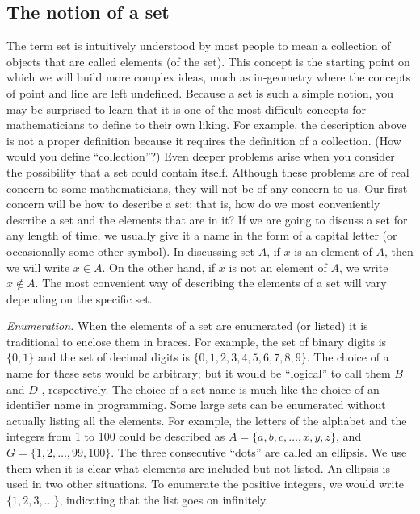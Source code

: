 \documentclass[10pt,]{book}
\theoremstyle{plain}
\theoremstyle{definition}
\begin{document}
\subsection[The notion of a set]{The notion of a set}\label{subsection-1}
The term set is intuitively understood by most people to mean a collection of objects that are called elements (of the set). This concept is the
starting point on which we will build more complex ideas, much as in-geometry where the concepts of point and line are left undefined. 
Because a set is such a simple notion, you may be surprised to learn that it is one of the most difficult concepts for mathematicians to define to
their own liking. For example, the description above is not a proper definition because it requires the definition of a collection. (How would you
define ``collection''?) Even deeper problems arise when you consider the possibility that a set could contain itself. Although these problems
are of real concern to some mathematicians, they will not be of any concern to us. 
Our first concern will be how to describe a set; that is, how do we most conveniently describe a set and the elements that are in it? If we are going to discuss a set for any length of time, we usually give it a name in the form of a capital letter (or occasionally some other symbol). In discussing set \( A\), if \( x\) is an element of \( A\), then we will write \(x \in  A\). On the other hand, if \( x\) is not an element
of \( A\), we write \(x \notin  A\). The most convenient way of describing the elements of a set will vary depending on the specific set. %
\par
\emph{ Enumeration.} When the elements of a set are enumerated (or listed) it is traditional to enclose them in braces. For example, the
set of binary digits is\(\{0, 1\}\) and the set of decimal digits is \(\{0, 1, 2, 3, 4, 5, 6, 7, 8, 9\}\). The choice of a name for these sets would
be arbitrary; but it would be ``logical'' to call them \( B\) and \( D\) , respectively. The choice of a set name is much like the
choice of an identifier name in programming. Some large sets can be enumerated without actually listing all the elements. For example, the letters
of the alphabet and the integers from 1 to 100 could be described as 
\(A = \{a, b, c,\ldots , x, y, z\}\), and \(G = \{1, 2, \ldots  , 99, 100\}\). 
The three consecutive ``dots'' are called an ellipsis. We use them when it is clear what elements are included but not listed. An ellipsis is
used in two other situations. To enumerate the positive integers, we would write \(\{1, 2, 3,\ldots  \}\), indicating that the list goes on infinitely.
\end{document}
